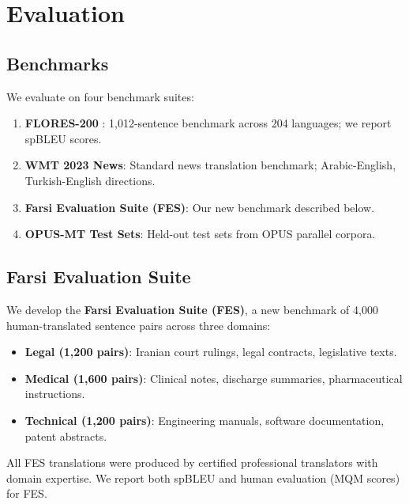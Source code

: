 \documentclass[11pt,twocolumn]{article}
\begin{document}
\section{Evaluation}
\label{sec:eval}

\subsection{Benchmarks}

We evaluate on four benchmark suites:

\begin{enumerate}[leftmargin=*,noitemsep]
  \item \textbf{FLORES-200} \citep{flores200_2022}: 1,012-sentence benchmark
        across 204 languages; we report spBLEU scores.
  \item \textbf{WMT 2023 News}: Standard news translation benchmark; Arabic-English,
        Turkish-English directions.
  \item \textbf{Farsi Evaluation Suite (FES)}: Our new benchmark described below.
  \item \textbf{OPUS-MT Test Sets}: Held-out test sets from OPUS parallel corpora.
\end{enumerate}

\subsection{Farsi Evaluation Suite}

We develop the \textbf{Farsi Evaluation Suite (FES)}, a new benchmark of 4,000
human-translated sentence pairs across three domains:
\begin{itemize}[leftmargin=*,noitemsep]
  \item \textbf{Legal (1,200 pairs)}: Iranian court rulings, legal contracts,
        legislative texts.
  \item \textbf{Medical (1,600 pairs)}: Clinical notes, discharge summaries,
        pharmaceutical instructions.
  \item \textbf{Technical (1,200 pairs)}: Engineering manuals, software
        documentation, patent abstracts.
\end{itemize}

All FES translations were produced by certified professional translators with
domain expertise. We report both spBLEU and human evaluation (MQM scores)
for FES.
\end{document}
